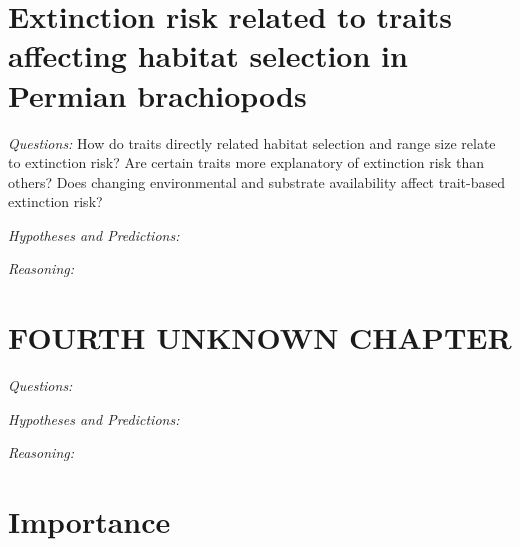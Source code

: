 \documentclass[12pt,letterpaper]{article}
\begin{document}
\section{Extinction risk related to traits affecting habitat selection in Permian brachiopods}

\textit{Questions:} How do traits directly related habitat selection and range size relate to extinction risk? Are certain traits more explanatory of extinction risk than others? Does changing environmental and substrate availability affect trait-based extinction risk?

\textit{Hypotheses and Predictions:}

\textit{Reasoning:}

\section{FOURTH UNKNOWN CHAPTER}

\textit{Questions:}

\textit{Hypotheses and Predictions:}

\textit{Reasoning:}


\section{Importance}


\clearpage


\end{document}
